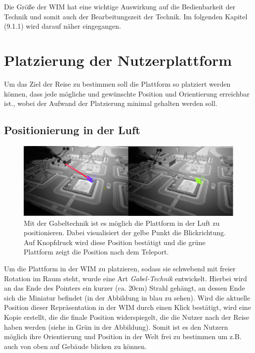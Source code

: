 Die Größe der WIM hat eine wichtige Auswirkung auf die Bedienbarkeit der Technik und somit auch der Bearbeitungszeit der Technik. Im folgenden Kapitel (9.1.1) wird darauf näher eingegangen.

\section{Platzierung der Nutzerplattform}
Um das Ziel der Reise zu bestimmen soll die Plattform so platziert werden können, dass jede mögliche und gewünschte Position und Orientierung erreichbar ist., wobei der Aufwand der Platzierung minimal gehalten werden soll.

\subsection{Positionierung in der Luft}

\begin{figure}[h!]
  \centering
  \includegraphics[width=\textwidth]{images/fork.png}
  \caption{Mit der Gabeltechnik ist es möglich die Plattform in der Luft zu positionieren. Dabei visualisiert der gelbe Punkt die Blickrichtung. Auf Knopfdruck wird diese Position bestätigt und die grüne Plattform zeigt die Position nach dem Teleport.}
  \label{fig:todo}
\end{figure}


Um die Plattform in der WIM zu platzieren, sodass sie schwebend mit freier Rotation im Raum steht, wurde eine Art \textit{Gabel-Technik} entwickelt. Hierbei wird an das Ende des Pointers ein kurzer (ca. 20cm) Strahl gehängt, an dessen Ende sich die Miniatur befindet (in der Abbildung in blau zu sehen). Wird die aktuelle Position dieser Repräsentation in der WIM durch einen Klick bestätigt, wird eine Kopie erstellt, die die finale Position widerspiegelt, die die Nutzer nach der Reise haben werden (siehe in Grün in der Abbildung).
Somit ist es den Nutzern möglich ihre Orientierung und Position in der Welt frei zu bestimmen um z.B. auch von oben auf Gebäude blicken zu können.


